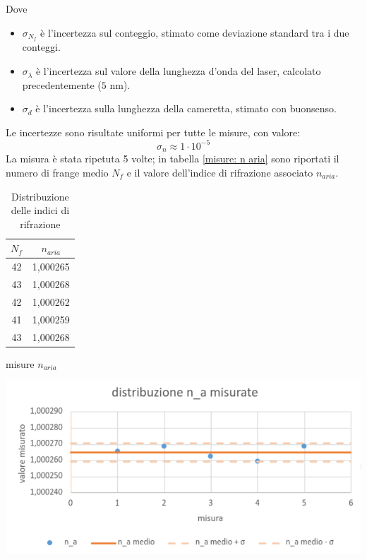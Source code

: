 \documentclass{article}
\begin{document}
        Dove
        \begin{itemize}
            \item $\sigma_{N_f}$ è l'incertezza sul conteggio, stimato come deviazione standard tra i due conteggi.
            \item $\sigma_{\lambda}$ è l'incertezza sul valore della lunghezza d'onda del laser, calcolato precedentemente ($5$ nm).
            \item $\sigma_d$ è l'incertezza sulla lunghezza della cameretta, stimato con buonsenso.
        \end{itemize}
         Le incertezze sono risultate uniformi per tutte le misure, con valore: 
            \[\sigma_n \approx 1\cdot10^{-5}\]
        La misura è stata ripetuta 5 volte; in tabella \ref{misure: n aria} sono riportati il numero di frange medio $N_f$ e il valore dell'indice di rifrazione associato $n_{aria}$.
        \begin{table}[H]
        \begin{minipage}[b]{0.35\linewidth}
        \centering
            \begin{tabular}{ cc } 
                \toprule 
                 $N_{f}$ & $n_{aria}$  \\
                \midrule 
                42 & 1,000265 \\
                43 & 1,000268\\
                42 & 1,000262\\
                41 & 1,000259\\
                43 & 1,000268\\
                \bottomrule           
            \end{tabular}
            \caption{misure $n_{aria}$}
            \label{misure: n aria}
            \end{minipage}
            \begin{minipage}[b]{0.65\linewidth}
                    \centering
                    \includegraphics[scale=0.3]{../images/graph_n_a.png}
                    \caption{Distribuzione delle indici di rifrazione}
                    \label{graph: Indici di rigrazione}
            \end{minipage}
        \end{table}
        
\end{document}
